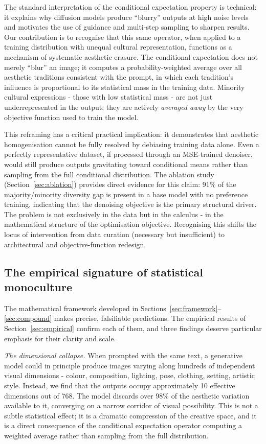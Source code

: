 \documentclass[11pt]{article}
\begin{document}
The standard interpretation of the conditional expectation property is technical: it explains why diffusion models produce ``blurry'' outputs at high noise levels and motivates the use of guidance and multi-step sampling to sharpen results. Our contribution is to recognise that this same operator, when applied to a training distribution with unequal cultural representation, functions as a mechanism of systematic aesthetic erasure. The conditional expectation does not merely ``blur'' an image; it computes a probability-weighted average over all aesthetic traditions consistent with the prompt, in which each tradition's influence is proportional to its statistical mass in the training data. Minority cultural expressions - those with low statistical mass - are not just underrepresented in the output; they are actively \textit{averaged away} by the very objective function used to train the model.

This reframing has a critical practical implication: it demonstrates that aesthetic homogenisation cannot be fully resolved by debiasing training data alone. Even a perfectly representative dataset, if processed through an MSE-trained denoiser, would still produce outputs gravitating toward conditional means rather than sampling from the full conditional distribution. The ablation study (Section~\ref{sec:ablation}) provides direct evidence for this claim: 91\% of the majority/minority diversity gap is present in a base model with no preference training, indicating that the denoising objective is the primary structural driver. The problem is not exclusively in the data but in the calculus - in the mathematical structure of the optimisation objective. Recognising this shifts the locus of intervention from data curation (necessary but insufficient) to architectural and objective-function redesign.

\subsection{The empirical signature of statistical monoculture}\label{sec:signature}

The mathematical framework developed in Sections~\ref{sec:framework}--\ref{sec:compound} makes precise, falsifiable predictions. The empirical results of Section~\ref{sec:empirical} confirm each of them, and three findings deserve particular emphasis for their clarity and scale.

\textit{The dimensional collapse.} When prompted with the same text, a generative model could in principle produce images varying along hundreds of independent visual dimensions - colour, composition, lighting, pose, clothing, setting, artistic style. Instead, we find that the outputs occupy approximately 10 effective dimensions out of 768. The model discards over 98\% of the aesthetic variation available to it, converging on a narrow corridor of visual possibility. This is not a subtle statistical effect; it is a dramatic compression of the creative space, and it is a direct consequence of the conditional expectation operator computing a weighted average rather than sampling from the full distribution.
\end{document}
